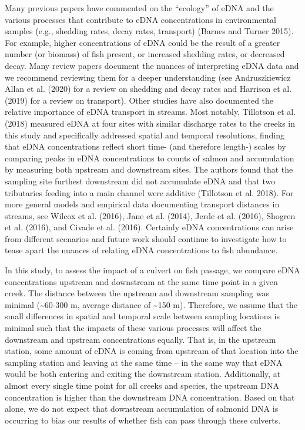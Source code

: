 \documentclass[
]{article}
\begin{document}
Many previous papers have commented on the ``ecology'' of eDNA and the
various processes that contribute to eDNA concentrations in
environmental samples (e.g., shedding rates, decay rates, transport)
(Barnes and Turner 2015). For example, higher concentrations of eDNA
could be the result of a greater number (or biomass) of fish present, or
increased shedding rates, or decreased decay. Many review papers
document the nuances of interpreting eDNA data and we recommend
reviewing them for a deeper understanding (see Andruszkiewicz Allan et
al. (2020) for a review on shedding and decay rates and Harrison et al.
(2019) for a review on transport). Other studies have also documented
the relative importance of eDNA transport in streams. Most notably,
Tillotson et al. (2018) measured eDNA at four sites with similar
discharge rates to the creeks in this study and specifically addressed
spatial and temporal resolutions, finding that eDNA concentrations
reflect short time- (and therefore length-) scales by comparing peaks in
eDNA concentrations to counts of salmon and accumulation by measuring
both upstream and downstream sites. The authors found that the sampling
site furthest downstream did not accumulate eDNA and that two
tributaries feeding into a main channel were additive (Tillotson et al.
2018). For more general models and empirical data documenting transport
distances in streams, see Wilcox et al. (2016), Jane et al. (2014),
Jerde et al. (2016), Shogren et al. (2016), and Civade et al. (2016).
Certainly eDNA concentrations can arise from different scenarios and
future work should continue to investigate how to tease apart the
nuances of relating eDNA concentrations to fish abundance.

In this study, to assess the impact of a culvert on fish passage, we
compare eDNA concentrations upstream and downstream at the same time
point in a given creek. The distance between the upstream and downstream
sampling was minimal (\textasciitilde60-300 m, average distance of
\textasciitilde150 m). Therefore, we assume that the small differences
in spatial and temporal scale between sampling locations is minimal such
that the impacts of these various processes will affect the downstream
and upstream concentrations equally. That is, in the upstream station,
some amount of eDNA is coming from upstream of that location into the
sampling station and leaving at the same time -- in the same way that
eDNA would be both entering and exiting the downstream station.
Additionally, at almost every single time point for all creeks and
species, the upstream DNA concentration is higher than the downstream
DNA concentration. Based on that alone, we do not expect that downstream
accumulation of salmonid DNA is occurring to bias our results of whether
fish can pass through these culverts.
\end{document}
